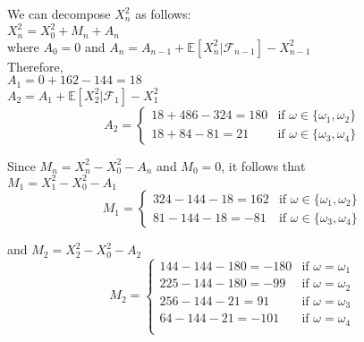 \documentclass[a4paper, 12pt]{article}
\begin{document}
\begin{enumerate}[label=\alph*)]
	We can decompose $X_n^2$ as follows:\\
	$X_n^2=X_0^2+M_n+A_n$\\
	where $A_0=0$ and $A_n = A_{n-1}+\mathbb{E}[X_n^2|\mathcal{F}_{n-1}]-X_{n-1}^2$\\
	
	Therefore,\\
	$A_1 = 0+162-144=18$\\
	$A_2 = A_1 +\mathbb{E}[X_2^2|\mathcal{F}_1]-X_1^2$\\
	\[
	A_2 = 
	\begin{cases}
	18+486-324=180 & \text{if } \omega\in \{\omega_1,\omega_2\}\\
	18+84-81=21 & \text{if } \omega\in \{\omega_3,\omega_4\}
	\end{cases}
	\]
	
	Since $M_n=X_n^2-X_0^2-A_n$ and $M_0=0$, it follows that\\
	$M_1=X_1^2-X_0^2-A_1$
	\[
	M_1 = 
	\begin{cases}
	324-144-18=162 & \text{if } \omega\in \{\omega_1,\omega_2\}\\
	81-144-18=-81 & \text{if } \omega\in \{\omega_3,\omega_4\}
	\end{cases}
	\]
	
	and $M_2 = X_2^2-X_0^2-A_2$
	\[
	M_2 = 
	\begin{cases}
	144-144-180=-180 & \text{if } \omega = \omega_1\\
	225-144-180=-99 & \text{if } \omega = \omega_2 \\
	256-144-21=91 & \text{if } \omega = \omega_3 \\
	64-144-21=-101 & \text{if } \omega = \omega_4 \\
	\end{cases}
	\]
\end{enumerate}
\end{document}
